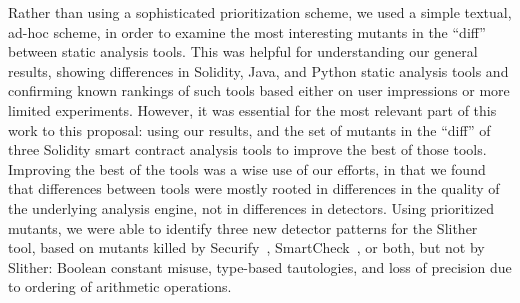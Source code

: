 Rather than using a sophisticated prioritization scheme, we used a
simple textual, ad-hoc scheme, in order to examine the most
interesting mutants in the ``diff'' between static analysis tools.
This was helpful for understanding our general results, showing
differences in Solidity, Java, and Python static analysis tools and
confirming known rankings of such tools based either on user
impressions or more limited experiments.  However, it was essential
for the most relevant part of this work to this proposal:  using our
results, and the set of mutants in the ``diff'' of three Solidity
smart contract analysis tools to improve the best of those tools.
Improving the best of the tools was a wise use of our efforts, in that
we found that differences between tools were mostly rooted in
differences in the quality of the underlying analysis engine, not in
differences in detectors.  Using prioritized mutants, we were able to
identify three new 
detector patterns for the Slither~\cite{slitherpaper} tool, based on mutants killed by
Securify~\cite{securify}, SmartCheck~\cite{sc:smartcheck}, or both, but not by Slither:  Boolean constant
misuse, type-based tautologies, and loss of precision due to ordering
of arithmetic operations.  

